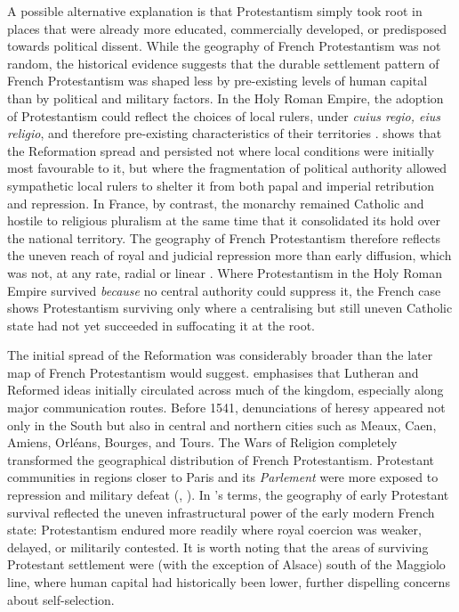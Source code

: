 \documentclass[12pt]{article}
\begin{document}
A possible alternative explanation is that Protestantism simply took root in places that were already more educated, commercially developed, or predisposed towards political dissent. While the geography of French Protestantism was not random, the historical evidence suggests that the durable settlement pattern of French Protestantism was shaped less by pre-existing levels of human capital than by political and military factors. In the Holy Roman Empire, the adoption of Protestantism could reflect the choices of local rulers, under \textit{cuius regio, eius religio}, and therefore pre-existing characteristics of their territories \parencite{cantoniAdoptingNewReligion2012a}. \textcite{grzymala2024popes} shows that the Reformation spread and persisted not where local conditions were initially most favourable to it, but where the fragmentation of political authority allowed sympathetic local rulers to shelter it from both papal and imperial retribution and repression. In France, by contrast, the monarchy remained Catholic and hostile to religious pluralism at the same time that it consolidated its hold over the national territory. The geography of French Protestantism therefore reflects the uneven reach of royal and judicial repression more than early diffusion, which was not, at any rate, radial or linear \parencite[p. 11]{leonardProtestantFrancais1955}. Where Protestantism in the Holy Roman Empire survived \textit{because} no central authority could suppress it, the French case shows Protestantism surviving only where a centralising but still uneven Catholic state had not yet succeeded in suffocating it at the root.

The initial spread of the Reformation was considerably broader than the later map of French Protestantism would suggest. \textcite{bostCarteProtestantismeFrancais1924} emphasises that Lutheran and Reformed ideas initially circulated across much of the kingdom, especially along major communication routes. Before 1541, denunciations of heresy appeared not only in the South but also in central and northern cities such as Meaux, Caen, Amiens, Orléans, Bourges, and Tours. The Wars of Religion completely transformed the geographical distribution of French Protestantism. Protestant communities in regions closer to Paris and its \textit{Parlement} were more exposed to repression and military defeat (\cite[p. 17]{leonardProtestantFrancais1955}, \cite{benedictFaithFortunesFrances2001, moursEglisesReformeesFrance1958}). In \textcite{mannAutonomousPowerState1984}'s terms, the geography of early Protestant survival reflected the uneven infrastructural power of the early modern French state: Protestantism endured more readily where royal coercion was weaker, delayed, or militarily contested. It is worth noting that the areas of surviving Protestant settlement were (with the exception of Alsace) south of the Maggiolo line, where human capital had historically been lower, further dispelling concerns about self-selection.
\end{document}
